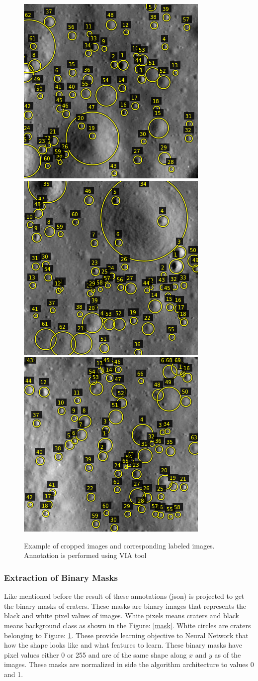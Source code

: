 \documentclass[11pt]{article}
\begin{document}
\begin{figure}[ht!]
	\includegraphics[width=.3\textwidth]{files/annotation/66n.png}\hfill
	\includegraphics[width=.3\textwidth]{files/annotation/29n.png}\hfill
	\includegraphics[width=.3\textwidth]{files/annotation/20n.png}
	\caption{Example of cropped images and corresponding labeled images. Annotation is performed using VIA tool}
	\label{ann}
\end{figure}

\subsubsection{Extraction of Binary Masks}
Like mentioned before the result of these annotations (json) is projected to get the binary masks of craters. These masks are binary images that represents the black and white pixel values of images. White pixels means craters and black means background class as shown in the Figure: \ref{mask}. White circles are craters belonging to Figure: \ref{ann}. These provide learning objective to Neural Network that how the shape looks like and what features to learn. These binary masks have pixel values either 0 or 255 and are of the same shape along $x$ and $y$ as of the images. These masks are normalized in side the algorithm architecture to values 0 and 1.
\end{document}
